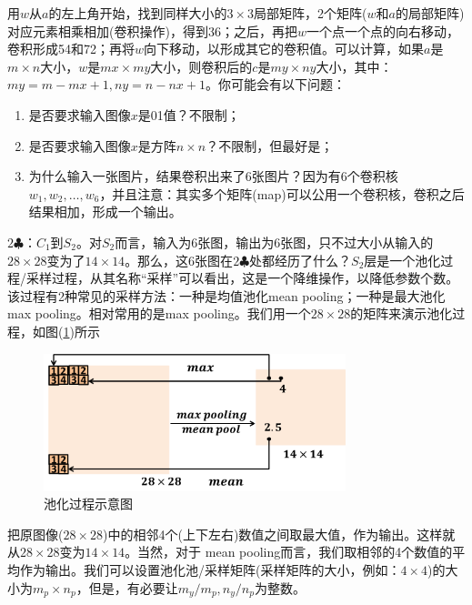             用$w$从$a$的左上角开始，找到同样大小的$3\times 3$局部矩阵，2个矩阵($w$和$a$的局部矩阵)对应元素相乘相加(卷积操作)，得到36；之后，再把$w$一个点一个点的向右移动，卷积形成54和72；再将$w$向下移动，以形成其它的卷积值。可以计算，如果$a$是$m\times n$大小，$w$是$mx\times my$大小，则卷积后的$c$是$my\times ny$大小，其中：$my = m-mx+1,ny= n-nx+1$。你可能会有以下问题：
            \begin{enumerate}
            \item 是否要求输入图像$x$是01值？不限制；
            \item 是否要求输入图像$x$是方阵$n\times n$？不限制，但最好是；
            \item 为什么输入一张图片，结果卷积出来了6张图片？因为有6个卷积核$w_1,w_2,\dots,w_6$，并且注意：其实多个矩阵(map)可以公用一个卷积核，卷积之后结果相加，形成一个输出。
            \end{enumerate}
            $2\clubsuit$：$C_1$到$S_2$。对$S_2$而言，输入为6张图，输出为6张图，只不过大小从输入的$28\times 28$变为了$14\times 14$。那么，这6张图在$2\clubsuit$处都经历了什么？$S_2$层是一个池化过程/采样过程，从其名称“采样”可以看出，这是一个降维操作，以降低参数个数。该过程有2种常见的采样方法：一种是均值池化mean pooling；一种是最大池化max pooling。相对常用的是max pooling。我们用一个$28\times 28$的矩阵来演示池化过程，如图(\ref{fig:池化过程示意图})所示
            \begin{figure}[H]
            \centering
            \includegraphics[height=4cm]{images/pooling_process.png}
            \caption{池化过程示意图}
            \label{fig:池化过程示意图}
            \end{figure}
            把原图像($28\times 28$)中的相邻4个(上下左右)数值之间取最大值，作为输出。这样就从$28\times 28$变为$14\times 14$。当然，对于 mean pooling而言，我们取相邻的4个数值的平均作为输出。我们可以设置池化池/采样矩阵(采样矩阵的大小，例如：$4\times 4$)的大小为$m_p\times n_p$，但是，有必要让$m_y/m_p,n_y/n_p$为整数。
